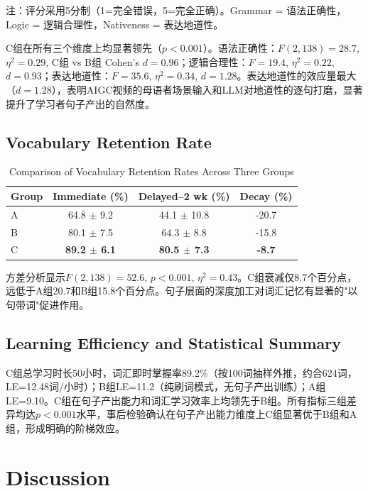 \documentclass[12pt,a4paper]{ctexart}
\begin{document}
注：评分采用5分制（1=完全错误，5=完全正确）。Grammar = 语法正确性，Logic = 逻辑合理性，Nativeness = 表达地道性。

C组在所有三个维度上均显著领先（$p<0.001$）。语法正确性：$F(2,138)=28.7$, $\eta^2=0.29$, C组 vs B组 Cohen's $d=0.96$；逻辑合理性：$F=19.4$, $\eta^2=0.22$, $d=0.93$；表达地道性：$F=35.6$, $\eta^2=0.34$, $d=1.28$。表达地道性的效应量最大（$d=1.28$），表明AIGC视频的母语者场景输入和LLM对地道性的逐句打磨，显著提升了学习者句子产出的自然度。

\subsection{Vocabulary Retention Rate}

\begin{table}[H]
\centering
\small
\caption{Comparison of Vocabulary Retention Rates Across Three Groups}
\begin{tabular}{lccc}
\toprule
\textbf{Group} & \textbf{Immediate (\%)} & \textbf{Delayed--2 wk (\%)} & \textbf{Decay (\%)} \\
\midrule
A & 64.8 $\pm$ 9.2 & 44.1 $\pm$ 10.8 & -20.7 \\
B & 80.1 $\pm$ 7.5 & 64.3 $\pm$ 8.8 & -15.8 \\
C & \textbf{89.2 $\pm$ 6.1} & \textbf{80.5 $\pm$ 7.3} & \textbf{-8.7} \\
\bottomrule
\end{tabular}
\end{table}

方差分析显示$F(2,138)=52.6$, $p<0.001$, $\eta^2=0.43$。C组衰减仅8.7个百分点，远低于A组20.7和B组15.8个百分点。句子层面的深度加工对词汇记忆有显著的"以句带词"促进作用。

\subsection{Learning Efficiency and Statistical Summary}
C组总学习时长50小时，词汇即时掌握率89.2\%（按100词抽样外推，约合624词，LE=12.48词/小时）；B组LE=11.2（纯刷词模式，无句子产出训练）；A组LE=9.10。C组在句子产出能力和词汇学习效率上均领先于B组。所有指标三组差异均达$p<0.001$水平，事后检验确认在句子产出能力维度上C组显著优于B组和A组，形成明确的阶梯效应。


\section{Discussion}  %
\end{document}
